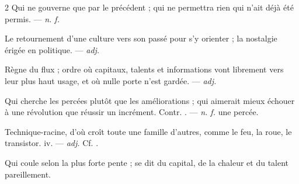 \begin{multicols}{2}
 Qui ne gouverne que par le précédent ; qui ne permettra rien qui n'ait déjà été permis. —  \textit{n. f.}

 Le retournement d'une culture vers son passé pour s'y orienter ; la nostalgie érigée en politique. —  \textit{adj.}

 Règne du flux ; ordre où capitaux, talents et informations vont librement vers leur plus haut usage, et où nulle porte n'est gardée. —  \textit{adj.}

 Qui cherche les percées plutôt que les améliorations ; qui aimerait mieux échouer à une révolution que réussir un incrément. Contr. . —  \textit{n. f.} une percée.

 Technique-racine, d'où croît toute une famille d'autres, comme le feu, la roue, le transistor.   iv. —  \textit{adj.} Cf. .

 Qui coule selon la plus forte pente ; se dit du capital, de la chaleur et du talent pareillement.

\end{multicols}

